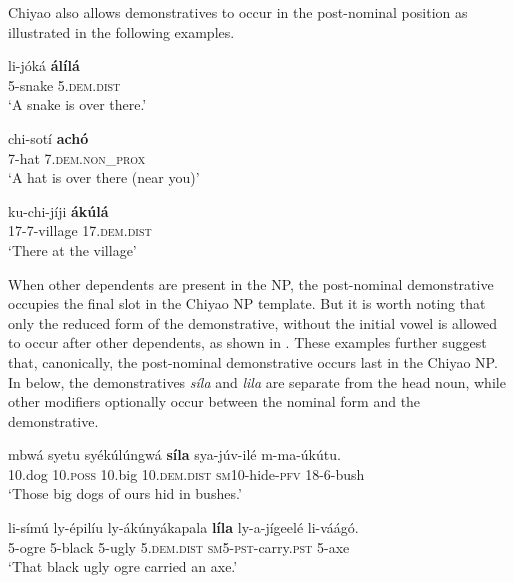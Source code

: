 \documentclass[output=paper,
            colorlinks, citecolor=brown
            ,draftmode
		  ]{langscibook}
\begin{document}
Chiyao also allows demonstratives to occur in the post-nominal position as illustrated in the following examples.

\ea%
    \label{ex:taji:22}
    \ea\label{ex:taji:22a} \gll li-jóká        \textbf{álílá}\\
      5-snake      5.\textsc{dem.dist}\\  
      \glt ‘A snake is over there.’        

    \ex\label{ex:taji:22b} \gll    chi-sotí    \textbf{achó}\\
        7-hat        7.\textsc{dem.non\_prox}\\
        \glt ‘A hat is over there (near you)’      

    \ex\label{ex:taji:22c} \gll    ku-chi-jíji          \textbf{ákúlá}\\
        17-7-village      17.\textsc{dem.dist}\\  
        \glt ‘There at the village’    
    \z
\z

When other dependents are present in the NP, the post-nominal demonstrative occupies the final slot in the Chiyao NP template. But it is worth noting that only the reduced form of the demonstrative, without the initial vowel is allowed to occur after other dependents, as shown in . These examples further suggest that, canonically, the post-nominal demonstrative occurs last in the Chiyao NP. In  below, the demonstratives \textit{síla}  and \textit{lila}  are separate from the head noun, while other modifiers optionally occur between the nominal form and the demonstrative.


\ea%
    \label{ex:taji:23}
    \ea\label{ex:taji:23a} \gll  mbwá      syetu          syékúlúngwá    \textbf{síla}                        sya-júv-ilé              m-ma-úkútu.\\
10.dog    10.\textsc{poss}    10.big                  10.\textsc{dem.dist}      \textsc{sm10}-hide-\textsc{pfv}    18-6-bush\\
\glt ‘Those big dogs of ours hid in bushes.’



    \ex\label{ex:taji:23b} \gll  li-símú    ly-épilíu    ly-ákúnyákapala    \textbf{líla}                        ly-a-jígeelé                      li-váágó.\\
    5-ogre        5-black      5-ugly                     5.\textsc{dem.dist}      \textsc{sm5-pst}-carry.\textsc{pst}      5-axe\\
    \glt ‘That black ugly ogre carried an axe.’
    \z
\z
\end{document}
